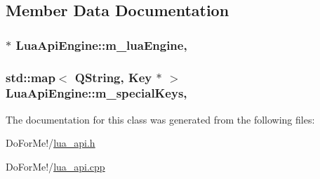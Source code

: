 \subsection{Member Data Documentation}
\hypertarget{class_lua_api_engine_afff2b87b3c828c0904df2d7e6f6bd389}{
\subsubsection[{m\-\_\-lua\-Engine}]{ $\ast$ Lua\-Api\-Engine\-::m\-\_\-lua\-Engine\hspace{0.3cm}{\ttfamily [static]}, {\ttfamily [private]}}}\label{class_lua_api_engine_afff2b87b3c828c0904df2d7e6f6bd389}
\hypertarget{class_lua_api_engine_a9fdba2d7f2f8d051453b5d1561435f5e}{
\subsubsection[{m\-\_\-special\-Keys}]{\setlength{\rightskip}{0pt plus 5cm}std\-::map$<$ Q\-String, {\bf Key} $\ast$ $>$ Lua\-Api\-Engine\-::m\-\_\-special\-Keys\hspace{0.3cm}{\ttfamily [static]}, {\ttfamily [private]}}}\label{class_lua_api_engine_a9fdba2d7f2f8d051453b5d1561435f5e}


The documentation for this class was generated from the following files\-:\begin{DoxyCompactItemize}
\item 
Do\-For\-Me!/\hyperlink{lua__api_8h}{lua\-\_\-api.\-h}\item 
Do\-For\-Me!/\hyperlink{lua__api_8cpp}{lua\-\_\-api.\-cpp}\end{DoxyCompactItemize}
